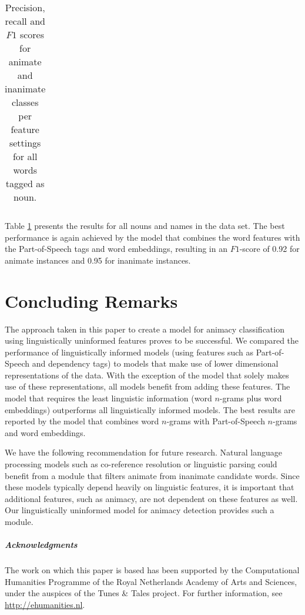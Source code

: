 \documentclass[a4paper,UKenglish]{oasics}
\begin{document}
\begin{table}
\begin{tabular}{llrrrr}
\bottomrule
\end{tabular}
\caption{Precision, recall and $F1$ scores for animate and inanimate classes
  per feature settings for all words tagged as noun.}
\label{tab:results-noun}
\end{table}

Table \ref{tab:results-noun} presents the results for all nouns and
names in the data set. The best performance is again achieved by the
model that combines the word features with the Part-of-Speech tags and
word embeddings, resulting in an $F1$-score of 0.92 for animate
instances and 0.95 for inanimate instances.


\section{Concluding Remarks}

The approach taken in this paper to create a model for animacy
classification using linguistically uninformed features proves to be
successful. We compared the performance of linguistically informed
models (using features such as Part-of-Speech and dependency tags) to
models that make use of lower dimensional representations of the
data. With the exception of the model that solely makes use of these
representations, all models benefit from adding these features. The
model that requires the least linguistic information (word $n$-grams
plus word embeddings) outperforms all linguistically informed
models. The best results are reported by the model that combines word
$n$-grams with Part-of-Speech $n$-grams and word embeddings.

We have the following recommendation for future research. Natural
language processing models such as co-reference resolution or
linguistic parsing could benefit from a module that filters animate
from inanimate candidate words. Since these models typically depend
heavily on linguistic features, it is important that additional
features, such as animacy, are not dependent on these features as
well. Our linguistically uninformed model for animacy detection
provides such a module.



\subparagraph*{Acknowledgments}

The work on which this paper is based has been supported by the
Computational Humanities Programme of the Royal Netherlands Academy of
Arts and Sciences, under the auspices of the Tunes \& Tales
project. For further information, see \url{http://ehumanities.nl}.


\end{document}
